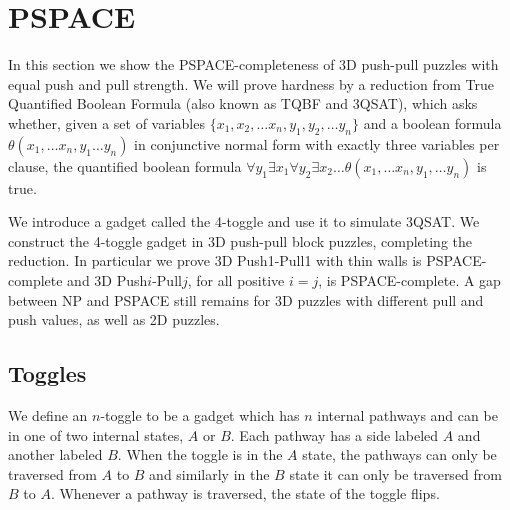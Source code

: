 \section{PSPACE}
\label{3DPSPACE}
In this section we show the PSPACE-completeness of 3D push-pull puzzles with equal push and pull strength. We will prove hardness by a reduction from True Quantified Boolean Formula (also known as TQBF and 3QSAT), which asks whether, given a set of variables $\{x_1, x_2, \ldots x_n, y_1, y_2, \ldots y_n\}$ and a boolean formula $\theta(x_1, \ldots x_n, y_1 \ldots y_n)$ in conjunctive normal form with exactly three variables per clause, the quantified boolean formula $\forall y_1 \exists x_1 \forall y_2 \exists x_2 \ldots \theta(x_1, \ldots x_n, y_1, \ldots y_n)$ is true.%

We introduce a gadget called the 4-toggle and use it to simulate 3QSAT\cite{NPBook}. We construct the 4-toggle gadget in 3D push-pull block puzzles, completing the reduction. In particular we prove 3D Push1-Pull1 with thin walls is PSPACE-complete and 3D Push$i$-Pull$j$, for all positive $i=j$, is PSPACE-complete. A gap between NP and PSPACE still remains for 3D puzzles with different pull and push values, as well as 2D puzzles. 


\subsection{Toggles}
We define an $n$-toggle to be a gadget which has $n$ internal pathways and can be in one of two internal states, $A$ or $B$. Each pathway has a side labeled $A$ and another labeled $B$. When the toggle is in the $A$ state, the pathways can only be traversed from $A$ to $B$ and similarly in the $B$ state it can only be traversed from $B$ to $A$. Whenever a pathway is traversed, the state of the toggle flips.


